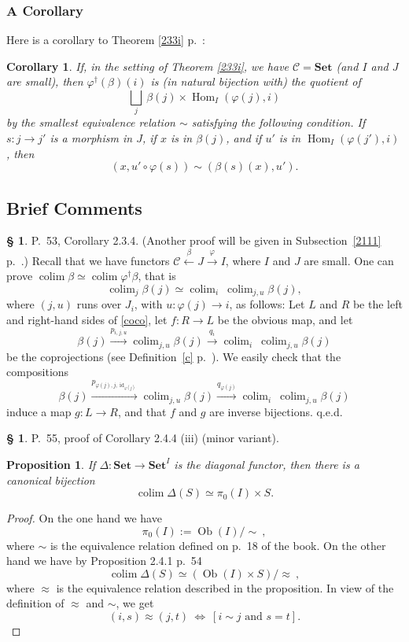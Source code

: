 \documentclass[12pt]{article}
\newtheorem{prop}[thm]{Proposition}
\newtheorem{cor}[thm]{Corollary}
\theoremstyle{remark}
\theoremstyle{definition}
\newtheorem{s}[thm]{\S}
\newcommand{\C}{\mathcal C}
\newcommand{\Set}{\mathbf{Set}}
\newcommand{\mv}{ (minor variant)}
\newcommand{\bc}{\subsection{Brief Comments}}
\DeclareMathOperator*{\coli}{colim}
\DeclareMathOperator*{\co}{colim}
\DeclareMathOperator{\id}{id}
\DeclareMathOperator{\Hom}{Hom}%
\DeclareMathOperator{\Ob}{Ob}
\begin{document}
\subsubsection{A Corollary}
%
Here is a corollary to Theorem \ref{233i} p.~\pageref{233i}:
\begin{cor}\label{c233i}
If, in the setting of Theorem \ref{233i}, we have $\C=\Set$ (and $I$ and $J$ are small), then $\varphi^\dagger(\beta)(i)$ is (in natural bijection with) the quotient of 
$$
\bigsqcup_j\ \beta(j)\times\Hom_I(\varphi(j),i) 
$$ 
by the smallest equivalence relation $\sim$ satisfying the following condition. If $s:j\to j'$ is a morphism in $J$, if $x$ is in $\beta(j)$, and if $u'$ is in $\Hom_I(\varphi(j'),i)$, then 
$$
(x,u'\circ\varphi(s))\sim(\beta(s)(x),u'). 
$$
\end{cor}
%
%
\bc
%
\begin{s} P.~53, Corollary 2.3.4. (Another proof will be given in Subsection~\ref{2111} p.~\pageref{2111}.) Recall that we have functors $\C\xleftarrow\beta J\xrightarrow\varphi I$, where $I$ and $J$ are small. One can prove $\co\beta\simeq\co\varphi^\dagger\beta$, that is 
%
\begin{equation}\label{coco}
\co_j\beta(j)\simeq\co_i\ \co_{j,u}\beta(j),
\end{equation} 
%
where $(j,u)$ runs over $J_i$, with $u:\varphi(j)\to i$, as follows: Let $L$ and $R$ be the left and right-hand sides of \eqref{coco}, let $f:R\to L$ be the obvious map, and let
$$ 
\beta(j)\xrightarrow{p_{i,j,u}}\co_{j,u}\beta(j)\xrightarrow{q_i}\co_i\ \co_{j,u}\beta(j)
$$ 
be the coprojections (see Definition~\ref{c} p.~\pageref{c}). We easily check that the compositions 
$$
\beta(j)\xrightarrow{p_{\varphi(j),j,\id_{\varphi(j)}}}\co_{j,u}\beta(j)\xrightarrow{q_{\varphi(j)}}\co_i\ \co_{j,u}\beta(j)
$$ 
induce a map $g:L\to R$, and that $f$ and $g$ are inverse bijections. q.e.d.
\end{s}
%
%
\begin{s} 
P.~55, proof of Corollary 2.4.4 (iii)\mv.
%
\begin{prop}\label{244}
If $\Delta:\Set\to\Set^I$ is the diagonal functor, then there is a canonical bijection
$$
\coli\Delta(S)\simeq\pi_0(I)\times S.
$$
\end{prop} 
%
\begin{proof}
On the one hand we have 
$$
\pi_0(I):=\Ob(I)/\!\!\sim\ , 
$$
where $\sim$ is the equivalence relation defined on p.~18 of the book. On the other hand we have by Proposition 2.4.1 p.~54
$$
\coli\Delta(S)\simeq(\Ob(I)\times S)/\!\!\approx\ ,
$$
where $\approx$ is the equivalence relation described in the proposition. In view of the definition of $\approx$ and $\sim$, we get 
$$
(i,s)\approx(j,t)\ \iff\ [i\sim j\text{ and }s=t].
$$ 
\end{proof}
\end{s}
%
%
\end{document}
